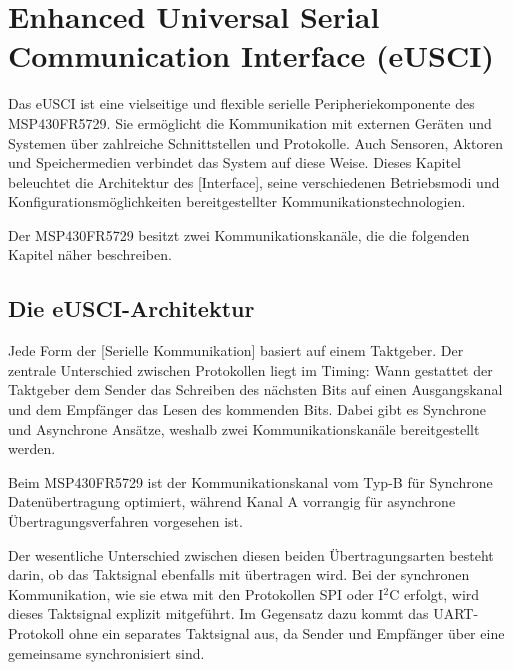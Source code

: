 \section{Enhanced Universal Serial Communication Interface (eUSCI)}
\label{sec:eUSCI}

Das eUSCI ist eine vielseitige und flexible serielle Peripheriekomponente des MSP430FR5729. Sie erm\"oglicht die Kommunikation mit externen Ger\"aten und Systemen \"uber zahlreiche Schnittstellen und Protokolle. Auch Sensoren, Aktoren und Speichermedien verbindet das System auf diese Weise. Dieses Kapitel beleuchtet die Architektur des [Interface], seine verschiedenen Betriebsmodi und Konfigurationsm\"oglichkeiten bereitgestellter Kommunikationstechnologien.

Der MSP430FR5729 besitzt zwei Kommunikationskan\"ale, die die folgenden Kapitel n\"aher beschreiben.

\newpage
\subsection{Die eUSCI-Architektur}
\label{sec:eUSCI_Architektur}

Jede Form der [Serielle Kommunikation] basiert auf einem Taktgeber. Der zentrale Unterschied zwischen Protokollen liegt im Timing: Wann gestattet der Taktgeber dem Sender das Schreiben des n\"achsten Bits auf einen Ausgangskanal und dem Empf\"anger das Lesen des kommenden Bits. Dabei gibt es Synchrone und Asynchrone Ans\"atze, weshalb zwei Kommunikationskan\"ale bereitgestellt werden. 

Beim MSP430FR5729 ist der Kommunikationskanal vom Typ-B f\"ur Synchrone Daten\"ubertragung optimiert, w\"ahrend Kanal A vorrangig f\"ur asynchrone \"Ubertragungsverfahren vorgesehen ist. 

Der wesentliche Unterschied zwischen diesen beiden \"Ubertragungsarten besteht darin, ob das Taktsignal ebenfalls mit \"ubertragen wird. Bei der synchronen Kommunikation, wie sie etwa mit den Protokollen SPI oder I$^{2}$C erfolgt, wird dieses Taktsignal explizit mitgef\"uhrt. Im Gegensatz dazu kommt das UART-Protokoll ohne ein separates Taktsignal aus, da Sender und Empf\"anger \"uber eine gemeinsame  synchronisiert sind. 

